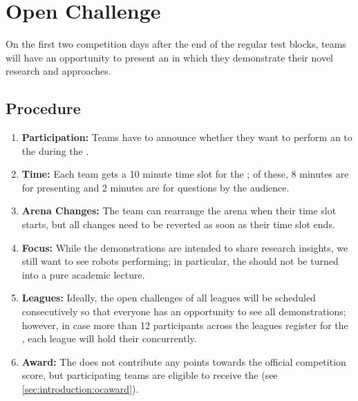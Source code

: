\section{Open Challenge}
\label{sec:rules:openchallenge}

On the first two competition days after the end of the regular test blocks, teams will have an opportunity to present an \OpenChallenge{} in which they demonstrate their novel research and approaches.

\subsection{Procedure}
\label{sec:rules:ocprocedure}
\begin{enumerate}
	\item \textbf{Participation:} Teams have to announce whether they want to perform an \OpenChallenge{} to the  during the \SetupDays{}.
	\item \textbf{Time:} Each team gets a 10 minute time slot for the \OpenChallenge; of these, 8 minutes are for presenting and 2 minutes are for questions by the audience.
	\item \textbf{Arena Changes:} The team can rearrange the arena when their time slot starts, but all changes need to be reverted as soon as their time slot ends.
	\item \textbf{Focus:} While the demonstrations are intended to share research insights, we still want to see robots performing; in particular, the \OpenChallenge{} should not be turned into a pure academic lecture.
	\item \textbf{Leagues:} Ideally, the open challenges of all \AtHome{} leagues will be scheduled consecutively so that everyone has an opportunity to see all demonstrations; however, in case more than 12 participants across the leagues register for the \OpenChallenge, each league will hold their \OpenChallenge{} concurrently.
	\item \textbf{Award:} The \OpenChallenge{} does not contribute any points towards the official competition score, but participating teams are eligible to receive the \OCAward{} (see \ref{sec:introduction:ocaward}).
\end{enumerate}
